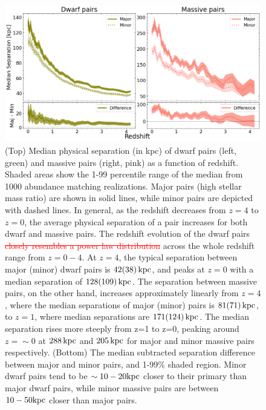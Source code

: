 \documentclass[twocolumn]{aastex631}
\newcommand{\remove}[1]{\textcolor{red}{#1}}
\begin{document}
\begin{figure}[htp]
  \centering
  \includegraphics[width=\textwidth]{separation_1000.png}
  \caption{(Top) Median physical separation (in kpc) of dwarf pairs (left, green) and massive pairs (right, pink) as a function of redshift. 
  Shaded areas show the 1-99 percentile range of the median from 1000 abundance matching realizations. 
  Major pairs (high stellar mass ratio) are shown in solid lines, while minor pairs are depicted with dashed lines.
  In general, as the redshift decreases from $z=4$ to $z=0$, the average physical separation of a pair increases for both dwarf and massive pairs. 
  The redshift evolution of the dwarf pairs \remove{\st{closely resembles a power law distribution}} across the whole redshift range from $z=0-4$.
  At $z=4$, the typical separation between major (minor) dwarf pairs is $42(38)\,\mathrm{kpc}$, and peaks at $z=0$ with a median separation of $128(109)\,\mathrm{kpc}$.
  The separation between massive pairs, on the other hand, increases approximately linearly from $z=4$, where the median separations of major (minor) pairs is $81(71)\,\mathrm{kpc}$, to $z=1$, where median separations are $171(124)\,\mathrm{kpc}$. The median separation rises more steeply from z=1 to z=0, peaking around $z=\sim0$ at $288\,\mathrm{kpc}$ and $205\,\mathrm{kpc}$ for major and minor massive pairs respectively.
  (Bottom) The median subtracted separation difference between major and minor pairs, and 1-99\% shaded region.
  Minor dwarf pairs tend to be $\sim10-20\mathrm{kpc}$ closer to their primary than major dwarf pairs, while minor massive pairs are between $10-50\mathrm{kpc}$ closer than major pairs. 
    }
  \label{fig:sep}
\end{figure}
\end{document}
